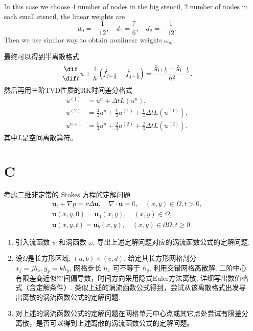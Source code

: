 \documentclass[12pt]{article}
\begin{document}
In this case we choose 4 number of nodes in the big stencil,
2 number of nodes in each small stencil, the linear weights are
\begin{equation}
	d_0 = − \frac{1}{12} ,\quad  d_1 = \frac{7}{6} ,\quad d_2 = − \frac{1}{12}.
\end{equation}
Then we use similar way to obtain nonlinear weights $\omega_{m}$.

最终可以得到半离散格式
\begin{equation}
	\frac{\dif}{\dif t}u + \frac{1}{h}\left(\hat{f}_{j+\frac{1}{2}}-\hat{f}_{j-\frac{1}{2}}\right)=\frac{\hat{g}_{i+\frac{1}{2}}-\hat{g}_{i-\frac{1}{2}}}{h^2}.
\end{equation}
然后再用三阶TVD性质的RK时间差分格式
\begin{equation}
	\begin{aligned}
		{u}^{(1)} & ={u}^{n}+\Delta t L\left({u}^{n}\right)    ,                                             \\
		{u}^{(2)} & =\frac{3}{4} {u}^{n}+\frac{1}{4} {u}^{(1)}+\frac{1}{4} \Delta t L\left({u}^{(1)}\right), \\
		{u}^{n+1} & =\frac{1}{3} {u}^{n}+\frac{2}{3} {u}^{(2)}+\frac{2}{3} \Delta t L\left({u}^{(2)}\right).
	\end{aligned}
	\label{eq:11}
\end{equation}
其中$L$是空间离散算符。



\section{C}

考虑二维非定常的 Stokes 方程的定解问题
\begin{equation}
	\begin{aligned}
		\bm{u}_{t}+\nabla p=\nu \Delta \bm{u}, \quad \nabla \cdot \bm{u}=0, \quad(x, y) \in \Omega, t>0, \\
		\bm{u}(x, y, 0)=\bm{u}_{0}(x, y), \quad (x, y) \in \Omega,                                       \\
		\bm{u}(x, y, t)=\bm{u}_{b}(x, y), \quad (x, y) \in \partial \Omega, t \geq 0.
	\end{aligned}
\end{equation}
\begin{enumerate}
	\item 引入流函数 $\psi$ 和涡函数 $\omega$, 导出上述定解问题对应的涡流函数公式的定解问题.
	\item 设$\Omega$是长方形区域, $(a, b) \times(c, d)$, 给定其长方形网格剖分 $x_{j}=j h_{x}, y_{k}=k h_{y}$, 网格步长 $h_{x}$ 可不等于 $h_{y}$, 利用交错网格离散解, 二阶中心有限差商近似空间偏导数，时间方向采用隐式Euler方法离散, 详细写出数值格式（含定解条件）. 类似上述的涡流函数公式得到，尝试从该离散格式出发导出离散的涡流函数公式的定解问题.
	\item 对上述的涡流函数公式的定解问题在网格单元中心点或其它点处尝试有限差分离散，是否可以得到上述离散的涡流函数公式的定解问题。
\end{enumerate}
\end{document}
